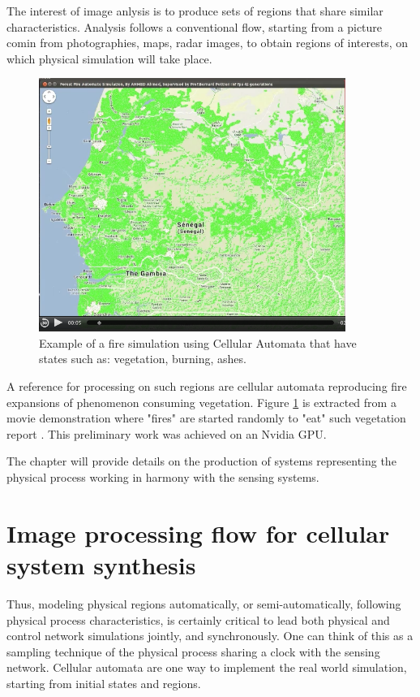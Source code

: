 The interest of image anlysis is to  produce sets of  regions that share similar characteristics.
Analysis follows a conventional flow, starting from a picture comin from
photographies, maps, radar images, to obtain regions of interests, on which physical simulation  will
take place.

\begin{figure}[hbtp]
\begin{center} 
\includegraphics[width=10cm]{AhmedFire.png}
\caption{Example of a fire simulation  using Cellular Automata that have  states such as:
vegetation, burning, ashes.}
\label{fig:AhmedFire}
\end{center}
\end{figure}

A reference for processing on such regions are cellular automata
reproducing fire expansions of phenomenon consuming  vegetation.
Figure \ref{fig:AhmedFire} is extracted from a
movie demonstration where "fires" are started randomly to "eat" such vegetation report \cite{AhmedFire}. This
preliminary work was achieved on an Nvidia GPU.

The chapter will provide details on the production of   systems representing the physical
process working in harmony with the sensing systems.

\section{Image processing  flow for cellular system synthesis}

Thus,   modeling  physical regions automatically, or semi-automatically, following physical process 
characteristics, is certainly critical to lead both physical and control network  simulations jointly,
and synchronously. One can think of this as a sampling technique of the physical process sharing
a clock with the sensing network. Cellular automata are one way to implement the real world simulation,
starting from initial states and regions.


